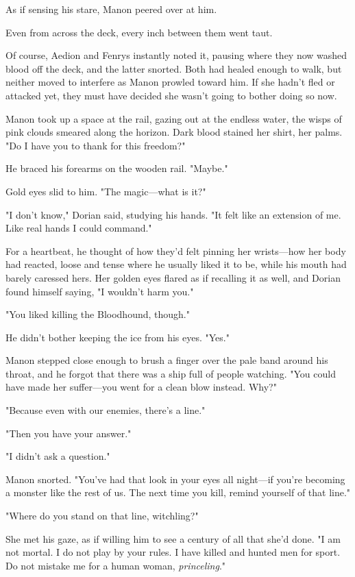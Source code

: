 As if sensing his stare, Manon peered over at him.

Even from across the deck, every inch between them went taut.

Of course, Aedion and Fenrys instantly noted it, pausing where they now washed blood off the deck, and the latter snorted. Both had healed enough to walk, but neither moved to interfere as Manon prowled toward him. If she hadn't fled or attacked yet, they must have decided she wasn't going to bother doing so now.

Manon took up a space at the rail, gazing out at the endless water, the wisps of pink clouds smeared along the horizon. Dark blood stained her shirt, her palms. "Do I have you to thank for this freedom?"

He braced his forearms on the wooden rail. "Maybe."

Gold eyes slid to him. "The magic---what is it?"

"I don't know," Dorian said, studying his hands. "It felt like an extension of me. Like real hands I could command."

For a heartbeat, he thought of how they'd felt pinning her wrists---how her body had reacted, loose and tense where he usually liked it to be, while his mouth had barely caressed hers. Her golden eyes flared as if recalling it as well, and Dorian found himself saying, "I wouldn't harm you."

"You liked killing the Bloodhound, though."

He didn't bother keeping the ice from his eyes. "Yes."

Manon stepped close enough to brush a finger over the pale band around his throat, and he forgot that there was a ship full of people watching. "You could have made her suffer---you went for a clean blow instead. Why?"

"Because even with our enemies, there's a line."

"Then you have your answer."

"I didn't ask a question."

Manon snorted. "You've had that look in your eyes all night---if you're becoming a monster like the rest of us. The next time you kill, remind yourself of that line."

"Where do you stand on that line, witchling?"

She met his gaze, as if willing him to see a century of all that she'd done. "I am not mortal. I do not play by your rules. I have killed and hunted men for sport. Do not mistake me for a human woman,
\emph{princeling}."

